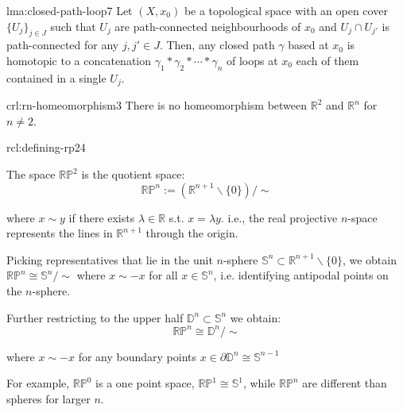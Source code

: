 \documentclass[landscape, 8pt]{extarticle}
\begin{document}
\begin{multicols*}{3}
\vspace{-7pt}
\begin{lma}{lma:closed-path-loop}{7}
	\vspace{-2pt}
	Let $(X, x_{0})$ be a topological space with an open cover $\{U_{j}\}_{j\in J}$ such that $U_{j}$ are path-connected neighbourhoods of $x_{0}$ and $U_{j} \cap U_{j'}$ is path-connected for any $j, j' \in J$. Then, any closed path $\gamma$ based at $x_{0}$ is homotopic to a concatenation $\gamma_{1} \ast \gamma_{2} \ast \cdots \ast \gamma_{n}$ of loops at $x_{0}$ each of them contained in a single $U_{j}$.
\end{lma}

\vspace{-7pt}
\begin{crl}{crl:rn-homeomorphism}{3}
	\vspace{-2pt}
	There is no homeomorphism between $\mathbb{R}^{2}$ and $\mathbb{R}^{n}$ for $n \ne 2$.
	\vspace{-2pt}
\end{crl}


\vspace{-7pt}
\begin{rcl}{rcl:defining-rp2}{4}
	\vspace{-2pt}
	\begin{enumerate-zero}
	    \item The space $\mathbb{RP}^{2}$ is the quotient space:
			\[\mathbb{RP}^{n} := (\mathbb{R}^{n+1} \backslash \{0\}) / \sim\]
			\par\vspace{-5pt}
			where $x \sim y$ if there exists $\lambda \in \mathbb{R}$ s.t. $x = \lambda y$. i.e., the real projective $n$-space represents the lines in $\mathbb{R}^{n+1}$ through the origin.
			\item Picking representatives that lie in the unit $n$-sphere $\mathbb{S}^{n} \subset \mathbb{R}^{n+1} \backslash \{0\}$, we obtain
				$\mathbb{RP}^{n} \cong \mathbb{S}^{n} / \sim$
				where $x \sim -x$ for all $x\in \mathbb{S}^{n}$, i.e. identifying antipodal points on the $n$-sphere.
			\item Further restricting to the upper half $\mathbb{D}^{n} \subset \mathbb{S}^{n}$ we obtain:
				\[\mathbb{RP}^{n} \cong \mathbb{D}^{n} / \sim\]
				\par\vspace{-6pt}
				where $x \sim -x$ for any boundary points $x\in \partial \mathbb{D}^{n} \cong \mathbb{S}^{n-1}$
	\end{enumerate-zero}
	\vspace{-5pt}
	\tcbline
	\vspace{-1.5pt}
	For example, $\mathbb{RP}^{0}$ is a one point space, $\mathbb{RP}^{1} \cong \mathbb{S}^{1}$, while $\mathbb{RP}^{n}$ are different than spheres for larger $n$.
\end{rcl}


\end{multicols*}
\end{document}
